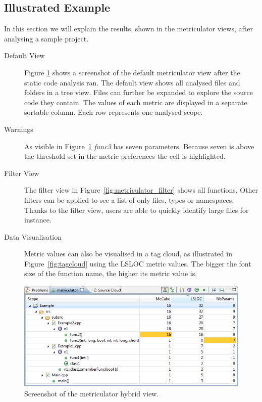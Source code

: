 \documentclass[11pt,a4paper,oneside]{scrreprt}
\begin{document}
\subsection*{Illustrated Example}
In this section we will explain the results, shown in the metriculator views, after analysing a sample project.\\
\begin{description}
\item[Default View] Figure \ref{fig:metriculator_hybrid} shows a screenshot of the default metriculator view after the static code analysis ran. The default view shows all analysed files and folders in a tree view. Files can further be expanded to explore the source code they contain. The values of each metric are displayed in a separate sortable column. Each row represents one analysed scope.
\item[Warnings] As visible in Figure~\ref{fig:metriculator_hybrid} \textit{func3} has seven parameters. Because seven is above the threshold set in the metric preferences the cell is highlighted.
\item[Filter View] The filter view in Figure~\ref{fig:metriculator_filter} shows all functions. Other filters can be applied to see a list of only files, types or namespaces. Thanks to the filter view, users are able to quickly identify large files for instance.
\item[Data Visualisation] Metric values can also be visualised in a tag cloud, as illustrated in Figure~\ref{fig:tagcloud} using the LSLOC metric values. The bigger the font size of the function name, the higher its metric value is.
\end{description}

\begin{figure}[th]
\begin{center}
\includegraphics[width=\textwidth]{figures/hybrid_view.png}
\end{center}
\caption{Screenshot of the metriculator hybrid view.}
\label{fig:metriculator_hybrid}
\end{figure}
\end{document}
